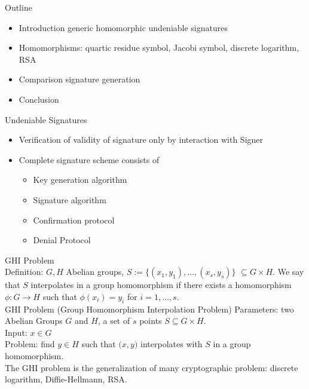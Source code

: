\documentclass[a4, landscape, slidesonly]{seminar}
\renewcommand{\emph}[1]{{\color{emphcolor} #1}}
\newcommand{\slidetitle}[1]{{\large \color{titlecolor} #1}}
\begin{document}
\begin{slide}
\slidetitle{Outline}
\\[.2cm]\begin{itemize}
\item Introduction generic homomorphic undeniable signatures
\item Homomorphisms: quartic residue symbol, Jacobi symbol, discrete logarithm, RSA
\item Comparison signature generation
\item Conclusion
\end{itemize}
\end{slide}
\begin{slide}
\slidetitle{Undeniable Signatures}
\\[.2cm]
\begin{itemize}
\item Verification of validity of signature only by interaction with Signer
\item Complete signature scheme consists of 
\begin{itemize}
\item Key generation algorithm
\item Signature algorithm
\item Confirmation protocol
\item Denial Protocol
\end{itemize}
\end{itemize}
\end{slide}
\begin{slide}
\slidetitle{GHI Problem}
\\[.2cm]
\emph{Definition:}
$G, H$ Abelian groups, $S := \{(x_{1},y_{1}),\ldots,(x_{s},y_{s})\}$ $ \subseteq G\times H$. We say that $S$ \emph{interpolates in a group homomorphism} 
 if there exists a homomorphism $\phi : G \to H$ such that $\phi (x_{i}) = y_{i}$ for $i = 1, \ldots, s$.\\[0.3cm]
\emph{GHI Problem \big(Group Homomorphism Interpolation Problem\big)}
\emph{Parameters:} two Abelian Groups $G$ and $H$, a set of $s$ points $S \subseteq G \times H$. \\
\emph{Input:} $x \in G$\\ 
\emph {Problem:} find $y \in H$ such that $\big( x,y\big)$ interpolates with $S$ in a group 
 homomorphism.\\[0.3cm] 
The GHI problem is the generalization of many cryptographic problem: discrete logarithm, Diffie-Hellmann, RSA.
\end{slide}
\end{document}
